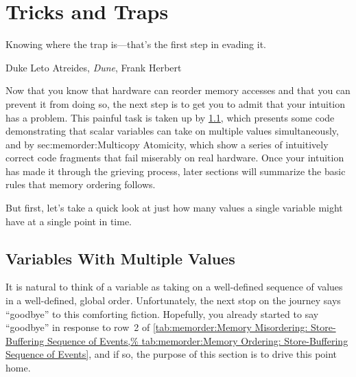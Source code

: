 \QuickQuizEnd

\section{Tricks and Traps}
\label{sec:memorder:Tricks and Traps}
%
\epigraph{Knowing where the trap is---that's the first step in evading it.}
	 {Duke Leto Atreides, \emph{Dune}, Frank Herbert}

Now that you know that hardware can reorder memory accesses and that you
can prevent it from doing so, the next step is to get you to admit
that your intuition has a problem.
This painful task is taken up by
\cref{sec:memorder:Variables With Multiple Values},
which presents some code demonstrating that scalar variables can
take on multiple values simultaneously,
and by
{sec:memorder:Multicopy Atomicity},
which show a series of intuitively correct code fragments that fail miserably
on real hardware.
Once your intuition has made it through the grieving process, later
sections will summarize the basic rules that memory ordering follows.

But first, let's take a quick look at just how many values a single
variable might have at a single point in time.

\subsection{Variables With Multiple Values}
\label{sec:memorder:Variables With Multiple Values}

It is natural to think of a variable as taking on a well-defined
sequence of values in a well-defined, global order.
Unfortunately, the next stop on the journey says ``goodbye'' to this comforting fiction.
Hopefully, you already started to say ``goodbye'' in response to row~2 of
\cref{tab:memorder:Memory Misordering: Store-Buffering Sequence of Events,%
tab:memorder:Memory Ordering: Store-Buffering Sequence of Events},
and if so, the purpose of this section is to drive this point home.

